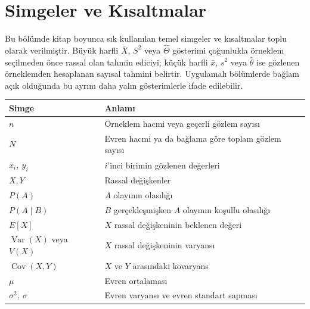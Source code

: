 \chapter*{Simgeler ve Kısaltmalar}

Bu bölümde kitap boyunca sık kullanılan temel simgeler ve kısaltmalar toplu
olarak verilmiştir. Büyük harfli $\bar X$, $S^2$ veya $\hat\Theta$ gösterimi
çoğunlukla örneklem seçilmeden önce rassal olan tahmin ediciyi; küçük harfli
$\bar x$, $s^2$ veya $\hat\theta$ ise gözlenen örneklemden hesaplanan sayısal
tahmini belirtir. Uygulamalı bölümlerde bağlam açık olduğunda bu ayrım daha
yalın gösterimlerle ifade edilebilir.

\small
\begingroup
\renewcommand{\arraystretch}{1.12}

\par\smallskip
\begin{center}
\begin{tabular}{@{}>{\RaggedRight\arraybackslash}p{}>{\RaggedRight\arraybackslash}p{}@{}}
\toprule
\textbf{Simge} & \textbf{Anlamı} \\
\midrule
$n$ & Örneklem hacmi veya geçerli gözlem sayısı \\
$N$ & Evren hacmi ya da bağlama göre toplam gözlem sayısı \\
$x_i,\ y_i$ & $i$'inci birimin gözlenen değerleri \\
$X,Y$ & Rassal değişkenler \\
$P(A)$ & $A$ olayının olasılığı \\
$P(A\mid B)$ & $B$ gerçekleşmişken $A$ olayının koşullu olasılığı \\
$E[X]$ & $X$ rassal değişkeninin beklenen değeri \\
$\operatorname{Var}(X)$ veya $V(X)$ & $X$ rassal değişkeninin varyansı \\
$\operatorname{Cov}(X,Y)$ & $X$ ve $Y$ arasındaki kovaryans \\
$\mu$ & Evren ortalaması \\
$\sigma^2,\ \sigma$ & Evren varyansı ve evren standart sapması \\
\bottomrule
\end{tabular}
\end{center}

